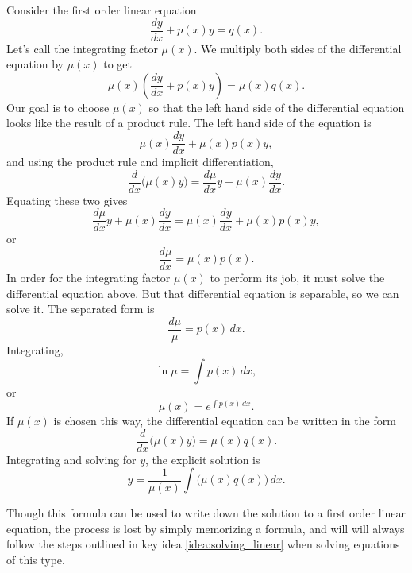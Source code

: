 Consider the first order linear equation
	\[
		\frac{dy}{dx} + p(x)y = q(x).
	\]
Let's call the integrating factor $\mu(x)$.  We multiply both sides of the differential equation by $\mu(x)$ to get
	\[
		\mu(x) \left ( \frac{dy}{dx} + p(x)y \right ) = \mu(x)q(x).
	\]
Our goal is to choose $\mu(x)$ so that the left hand side of the differential equation looks like the result of a product rule.  The left hand side of the equation is
	\[
		\mu(x) \frac{dy}{dx} + \mu(x)p(x)y,
	\]
and using the product rule and implicit differentiation,
	\[
		\frac{d}{dx} \big ( \mu(x) y \big ) = \frac{d\mu}{dx}y + \mu(x)\frac{dy}{dx}.
	\]
Equating these two gives
	\[
		\frac{d\mu}{dx}y + \mu(x)\frac{dy}{dx} = \mu(x) \frac{dy}{dx} + \mu(x)p(x)y,
	\]
or
	\[
		\frac{d\mu}{dx} = \mu(x)p(x).	
	\]
In order for the integrating factor $\mu(x)$ to perform its job, it must solve the differential equation above.  But that differential equation is separable, so we can solve it.  The separated form is
	\[
		\frac{d\mu}{\mu} = p(x)\,dx.
	\]
Integrating,
	\[
		\ln \mu = \int p(x)\,dx,
	\]
or
	\[
		\mu(x) = e^{\int p(x)\,dx}.
	\]
If $\mu(x)$ is chosen this way, the differential equation can be written in the form
	\[
		\frac{d}{dx} \big( \mu(x)y \big) = \mu(x)q(x).
	\]
Integrating and solving for $y$, the explicit solution is
	\[
		y = \frac{1}{\mu(x)}\int \big( \mu(x)q(x) \big)\,dx.
	\]
	

Though this formula can be used to write down the solution to a first order linear equation, the process is lost by simply memorizing a formula, and will will always follow the steps outlined in key idea \ref{idea:solving_linear} when solving equations of this type.
